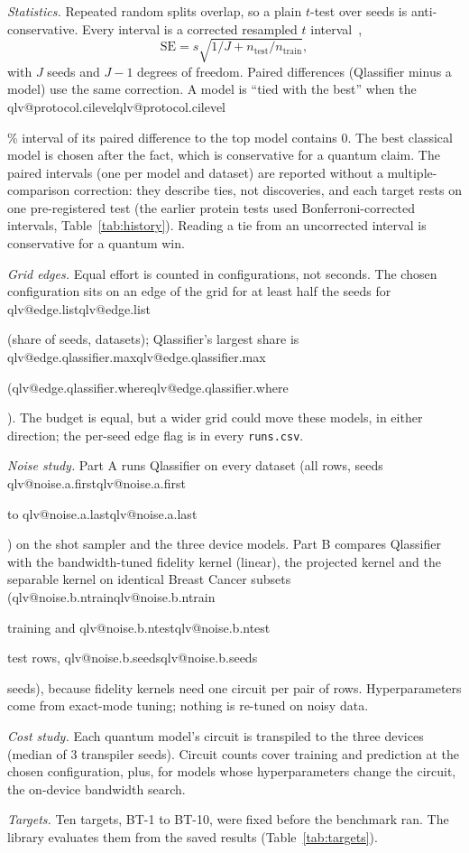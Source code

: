 \documentclass[aps,pra,reprint,superscriptaddress,nofootinbib,longbibliography]{revtex4-2}
\makeatletter
\newcommand{\val}[1]{\ifcsname qlv@#1\endcsname\csname qlv@#1\endcsname\else
  \PackageError{qlassifier}{No value '#1'}{Run python scripts/paper_tables.py}\fi}
\newcommand{\code}[1]{\texttt{#1}}
\makeatother
\begin{document}
\textit{Statistics.} Repeated random splits overlap, so a plain $t$-test over seeds is anti-conservative. Every interval
is a corrected resampled $t$ interval~\cite{nadeau2003inference},
\begin{equation}
\mathrm{SE} = s \sqrt{1/J + n_\text{test}/n_\text{train}},
\end{equation}
with $J$ seeds and $J-1$ degrees of freedom. Paired differences (Qlassifier minus a model) use the same correction. A
model is ``tied with the best'' when the \val{protocol.cilevel}\% interval of its paired difference to the top model
contains 0. The best classical model is chosen after the fact, which is conservative for a quantum claim. The paired
intervals (one per model and dataset) are reported without a multiple-comparison correction: they describe ties, not
discoveries, and each target rests on one pre-registered test (the earlier protein tests used Bonferroni-corrected
intervals, Table~\ref{tab:history}). Reading a tie from an uncorrected interval is conservative for a quantum win.

\textit{Grid edges.} Equal effort is counted in configurations, not seconds. The chosen configuration sits on an edge of
the grid for at least half the seeds for \val{edge.list} (share of seeds, datasets); Qlassifier's largest share is
\val{edge.qlassifier.max} (\val{edge.qlassifier.where}). The budget is equal, but a wider grid could move these
models, in either direction; the per-seed edge flag is in every \code{runs.csv}.

\textit{Noise study.} Part A runs Qlassifier on every dataset (all rows, seeds \val{noise.a.first} to
\val{noise.a.last}) on the shot sampler and the three device models. Part B compares Qlassifier with the bandwidth-tuned fidelity kernel (linear), the projected kernel and
the separable kernel on identical Breast Cancer subsets (\val{noise.b.ntrain} training and \val{noise.b.ntest} test
rows, \val{noise.b.seeds} seeds), because fidelity kernels need one circuit per pair of rows. Hyperparameters come
from exact-mode tuning; nothing is re-tuned on noisy data.

\textit{Cost study.} Each quantum model's circuit is transpiled to the three devices (median of 3 transpiler seeds).
Circuit counts cover training and prediction at the chosen configuration, plus, for models whose hyperparameters change
the circuit, the on-device bandwidth search.

\textit{Targets.} Ten targets, BT-1 to BT-10, were fixed before the benchmark ran. The library
evaluates them from the saved results (Table~\ref{tab:targets}).
\end{document}
